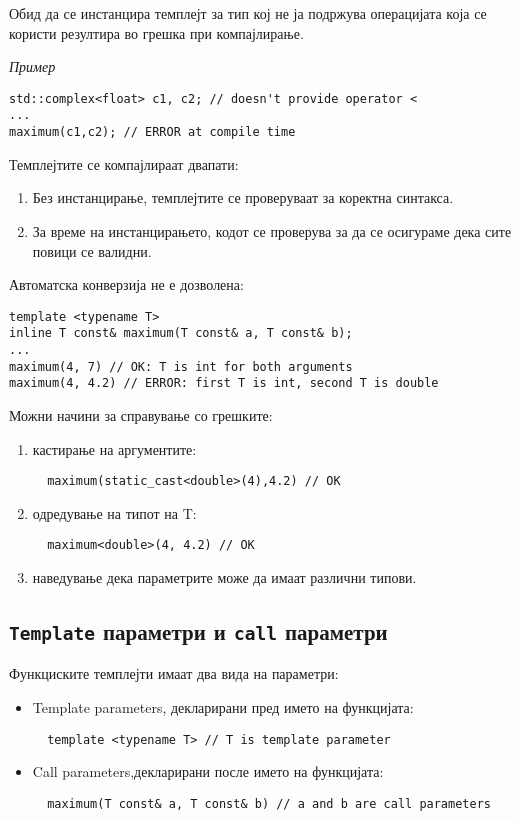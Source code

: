 Обид да се инстанцира темплејт за тип кој не ја подржува операцијата која се
користи резултира во грешка при компајлирање. 

\textsl{Пример}
\begin{lstlisting}
std::complex<float> c1, c2; // doesn't provide operator <
...
maximum(c1,c2); // ERROR at compile time
\end{lstlisting}


Темплејтите се компајлираат двапати:
\begin{enumerate}
  \item Без инстанцирање, темплејтите се проверуваат за коректна синтакса.
  \item За време на инстанцирањето, кодот се проверува за да се осигураме дека
сите повици се валидни.  
\end{enumerate}

Автоматска конверзија не е дозволена:
\begin{lstlisting}
template <typename T>
inline T const& maximum(T const& a, T const& b);
...
maximum(4, 7) // OK: T is int for both arguments
maximum(4, 4.2) // ERROR: first T is int, second T is double
\end{lstlisting}

Можни начини за справување со грешките:
\begin{enumerate}
  \item кастирање на аргументите:
  \begin{lstlisting}
  maximum(static_cast<double>(4),4.2) // OK
  \end{lstlisting}
  \item одредување на типот на T:
  \begin{lstlisting}
  maximum<double>(4, 4.2) // OK
  \end{lstlisting}
  \item наведување дека параметрите може да имаат различни типови. 
\end{enumerate}

\subsection{\texttt{Template} параметри и \texttt{call} параметри}

Функциските темплејти имаат два вида на параметри:
\begin{itemize}
  \item Template parameters, декларирани пред името на функцијата: 
  \begin{lstlisting}
  template <typename T> // T is template parameter
  \end{lstlisting}
  \item Call parameters,декларирани после името на функцијата: 
  \begin{lstlisting}
  maximum(T const& a, T const& b) // a and b are call parameters
  \end{lstlisting}
\end{itemize}

